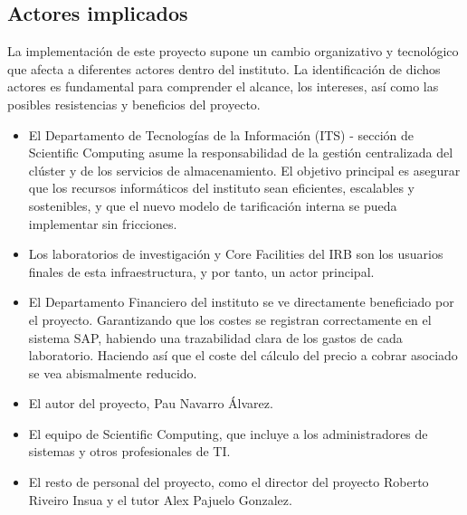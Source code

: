 \subsection{Actores implicados}
La implementación de este proyecto supone un cambio organizativo y tecnológico que afecta a diferentes 
actores dentro del instituto. La identificación de dichos actores es fundamental para comprender el alcance, 
los intereses, así como las posibles resistencias y beneficios del proyecto.
\begin{itemize}
    \item El Departamento de Tecnologías de la Información (ITS) - sección de Scientific Computing asume la responsabilidad 
    de la gestión centralizada del clúster y de los servicios de almacenamiento. El objetivo principal es asegurar que los 
    recursos informáticos del instituto sean eficientes, escalables y sostenibles, y que el nuevo modelo de tarificación interna 
    se pueda implementar sin fricciones. 
    \item Los laboratorios de investigación y Core Facilities del IRB son los usuarios finales de esta infraestructura, 
    y por tanto, un actor principal.
    \item El Departamento Financiero del instituto se ve directamente beneficiado por el proyecto. Garantizando que los costes se 
    registran correctamente en el sistema SAP, habiendo una trazabilidad clara de los gastos de cada laboratorio. Haciendo así 
    que el coste del  cálculo del precio a cobrar asociado se vea abismalmente reducido.
    \item El autor del proyecto, Pau Navarro Álvarez.
    \item El equipo de Scientific Computing, que incluye a los administradores de sistemas y otros profesionales de TI.
    \item El resto de personal del proyecto, como el director del proyecto Roberto Riveiro Insua y el tutor Alex Pajuelo Gonzalez.
\end{itemize}